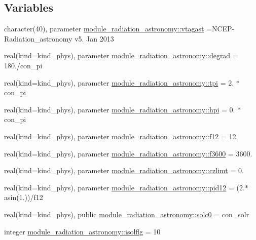 \subsection*{Variables}
\begin{DoxyCompactItemize}
\item 
character(40), parameter \hyperlink{namespacemodule__radiation__astronomy_aa3497dc9fa4bbd8248fdf0f2784c268a}{module\+\_\+radiation\+\_\+astronomy\+::vtagast} =\textquotesingle{}N\+C\+EP-\/Radiation\+\_\+astronomy v5. Jan 2013 \textquotesingle{}
\item 
real(kind=kind\+\_\+phys), parameter \hyperlink{group__module__radiation__astronomy_ga220d2b997b3073cf2985d62111c5405d}{module\+\_\+radiation\+\_\+astronomy\+::degrad} = 180./con\+\_\+pi
\item 
real(kind=kind\+\_\+phys), parameter \hyperlink{group__module__radiation__astronomy_ga4fbf4be04e17f1f8d0674ee2e20506b0}{module\+\_\+radiation\+\_\+astronomy\+::tpi} = 2. $\ast$ con\+\_\+pi
\item 
real(kind=kind\+\_\+phys), parameter \hyperlink{group__module__radiation__astronomy_ga7369d8561566f5e7e51ccc40e09f2520}{module\+\_\+radiation\+\_\+astronomy\+::hpi} = 0. $\ast$ con\+\_\+pi
\item 
real(kind=kind\+\_\+phys), parameter \hyperlink{group__module__radiation__astronomy_gad59856e8f877eb05a6b22610f14a391d}{module\+\_\+radiation\+\_\+astronomy\+::f12} = 12.
\item 
real(kind=kind\+\_\+phys), parameter \hyperlink{group__module__radiation__astronomy_ga37b491dde50d06e339effb4a31d9f245}{module\+\_\+radiation\+\_\+astronomy\+::f3600} = 3600.
\item 
real(kind=kind\+\_\+phys), parameter \hyperlink{group__module__radiation__astronomy_gafeb2fccbe8137de6099a09035762ff5e}{module\+\_\+radiation\+\_\+astronomy\+::czlimt} = 0.
\item 
real(kind=kind\+\_\+phys), parameter \hyperlink{group__module__radiation__astronomy_gadbf9cdfc7b55d882f015a4bc4ef276ab}{module\+\_\+radiation\+\_\+astronomy\+::pid12} = (2.$\ast$asin(1.))/f12
\item 
real(kind=kind\+\_\+phys), public \hyperlink{group__module__radiation__astronomy_ga37e08872f67023b11f839ac15151af09}{module\+\_\+radiation\+\_\+astronomy\+::solc0} = con\+\_\+solr
\item 
integer \hyperlink{group__module__radiation__astronomy_ga7ea431b6d4f4d6ee1f6545d6baeee44f}{module\+\_\+radiation\+\_\+astronomy\+::isolflg} = 10
\item 

\end{DoxyCompactItemize}
